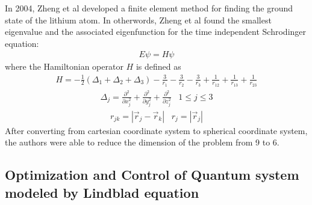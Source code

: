 \documentclass[a4paper,fleqn]{cas-sc}
\begin{document}
In 2004, Zheng et al \cite{zheng2004numerical} developed a finite element
method for finding the ground state of the lithium atom.  In otherwords,
Zheng et al found the smallest eigenvalue and the associated eigenfunction
for the time independent Schrodinger equation:
\begin{eqnarray}
E\psi=H\psi \label{time_independent}
\end{eqnarray}
where the Hamiltonian operator $H$ is defined as
\begin{eqnarray}
H=-\frac{1}{2}(\Delta_{1}+\Delta_{2}+\Delta_{3})-
\frac{3}{r_{1}}-
\frac{3}{r_{2}}-
\frac{3}{r_{3}}+
\frac{1}{r_{12}}+
\frac{1}{r_{13}}+
\frac{1}{r_{23}}
\end{eqnarray}
\begin{eqnarray}
\Delta_{j}=\frac{\partial^{2}}{\partial x_{j}^{2}}+ 
\frac{\partial^{2}}{\partial y_{j}^{2}}+ 
\frac{\partial^{2}}{\partial z_{j}^{2}} \hspace{10pt} 1\le j\le 3
\end{eqnarray}
\begin{eqnarray}
r_{jk}=|\vec{r}_{j}-\vec{r}_{k}| \hspace{10pt} r_{j}=|\vec{r}_{j}|
\end{eqnarray}
After converting from cartesian coordinate system to spherical 
coordinate system, the authors were able to reduce the dimension of the
problem from 9 to 6.

\subsection{Optimization and Control of Quantum system modeled
by Lindblad equation }
\end{document}

